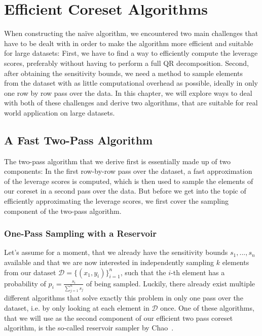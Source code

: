 \section{Efficient Coreset Algorithms}

When constructing the na\"ive algorithm, we encountered two
main challenges that have to be dealt with in order to make the
algorithm more efficient and suitable for large datasets:
First, we have to find a way to efficiently compute the
leverage scores, preferably without
having to perform a full QR decomposition.
Second, after obtaining the sensitivity bounds, we
need a method to sample elements from the dataset
with as little computational overhead as possible, ideally
in only one row by row pass over the data.
In this chapter, we will explore ways to deal with both of
these challenges and derive two algorithms, that are
suitable for real world application on large datasets.

\subsection{A Fast Two-Pass Algorithm}

The two-pass algorithm that we derive first is essentially
made up of two components:
In the first row-by-row pass over the dataset, a fast approximation
of the leverage scores is computed, which is then
used to sample the elements of our coreset in a second
pass over the data.
But before we get into the topic of efficiently approximating
the leverage scores, we first cover the sampling component
of the two-pass algorithm.

\subsubsection{One-Pass Sampling with a Reservoir}

Let's assume for a moment, that we already have the sensitivity
bounds $s_1, ..., s_n$ available and that we are now
interested in independently sampling $k$ elements from our dataset
$\mathcal{D} = \{(x_1, y_i)\}_{i=1}^n$, such that the
$i$-th element has a probability of
$p_i = \frac{s_i}{\sum_{j=1}^n s_j}$ of being sampled.
Luckily, there already exist multiple different algorithms
that solve exactly this problem in only one pass over the
dataset, i.e. by only looking at each element in $\mathcal{D}$
once. One of these algorithms, that we will use as the
second component of
our efficient two pass coreset algorithm,
is the so-called reservoir sampler by Chao~\cite{reservoir-sampler}.

